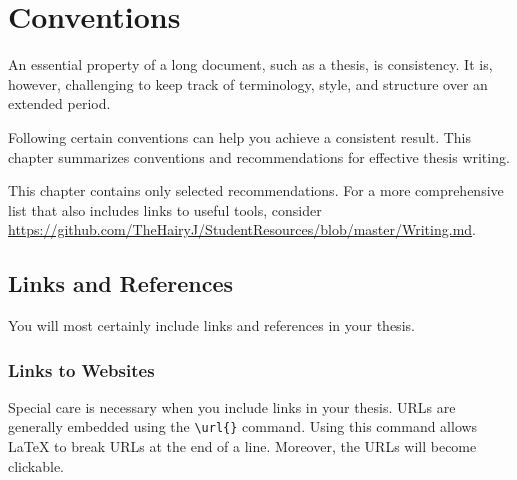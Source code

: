 \chapter{Conventions} %

\label{Chapter2} %


An essential property of a long document, such as a thesis, is consistency.%
It is, however, challenging to keep track of terminology, style, and structure over an extended period.

Following certain conventions can help you achieve a consistent result. This chapter summarizes conventions and recommendations for effective thesis writing.

This%
 chapter contains only selected recommendations. For a more comprehensive list that also includes links to useful tools, consider \url{https://github.com/TheHairyJ/StudentResources/blob/master/Writing.md}.

\section{Links and References}

You will most certainly include links and references in your thesis.

\subsection{Links to Websites}

Special care is necessary when you include links in your thesis. URLs are generally embedded using the \verb|\url{}| command. Using this command allows LaTeX to break URLs at the end of a line. Moreover, the URLs will become clickable.

